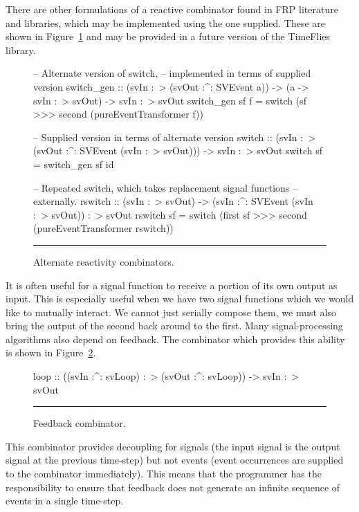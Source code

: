 \documentclass[draft]{llncs}
\begin{document}
There are other formulations of a reactive combinator found in FRP literature
and libraries, which may be implemented using the one supplied. These are shown
in Figure~\ref{figure:alternate_switching_combinators} and may be provided in a
future version of the TimeFlies library.

\begin{figure}
\begin{code}
-- Alternate version of switch,
-- implemented in terms of supplied version
switch_gen ::    (svIn :~> (svOut :^: SVEvent a))
              -> (a -> svIn :~> svOut)
              -> svIn :~> svOut
switch_gen sf f =
  switch (sf >>> second (pureEventTransformer f))

-- Supplied version in terms of alternate version
switch ::    (svIn :~> (svOut :^: SVEvent (svIn :~> svOut)))
          -> svIn :~> svOut
switch sf = switch_gen sf id

-- Repeated switch, which takes replacement signal functions
-- externally.
rswitch ::    (svIn :~> svOut)
           -> (svIn :^: SVEvent (svIn :~> svOut)) :~> svOut
rswitch sf =
  switch (first sf >>> second (pureEventTransformer rswitch))
\end{code}
\hrule
\caption{Alternate reactivity combinators.}
\label{figure:alternate_switching_combinators}
\end{figure}

It is often useful for a signal function to receive a portion of its
own output as input. This is especially useful when we have two
signal functions which we would like to mutually interact. We cannot
just serially compose them, we must also bring the output of the second
back around to the first. Many signal-processing algorithms also depend
on feedback. The combinator which provides this ability is shown
in Figure~\ref{figure:feedback_combinator}. 

\begin{figure}
\begin{code}
loop ::    ((svIn :^: svLoop) :~> (svOut :^: svLoop))
        -> svIn :~> svOut
\end{code}
\hrule
\caption{Feedback combinator.}
\label{figure:feedback_combinator}
\end{figure}

This combinator provides decoupling for signals
(the input signal is the output signal at the previous time-step)
but not events (event occurrences are supplied to the combinator immediately).
This means that the programmer has the responsibility to ensure that feedback
does not generate an infinite sequence of events in a single time-step.
\end{document}
